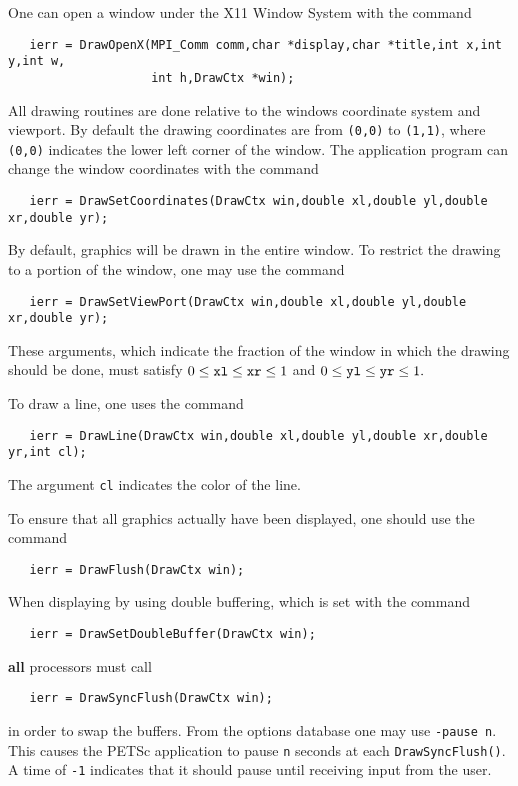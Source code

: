 One can open a window under the X11 Window System with the
command  
\begin{verbatim}
   ierr = DrawOpenX(MPI_Comm comm,char *display,char *title,int x,int y,int w,
                    int h,DrawCtx *win);
\end{verbatim}
All drawing routines are done relative to the windows coordinate system 
and viewport. By default the drawing coordinates are from {\tt (0,0)} to 
{\tt (1,1)}, where {\tt (0,0)} indicates the lower left corner of the 
window. The application program can change the window coordinates with the 
command  
\begin{verbatim}
   ierr = DrawSetCoordinates(DrawCtx win,double xl,double yl,double xr,double yr);
\end{verbatim}
By default, graphics will be drawn in the entire window. To restrict the 
drawing to a portion of the window, one may 
use the command 
\begin{verbatim}
   ierr = DrawSetViewPort(DrawCtx win,double xl,double yl,double xr,double yr);
\end{verbatim}
These arguments, which indicate the fraction of the window in which the 
drawing should be done, must satisfy 
$0 \le {\tt xl} \le {\tt xr} \le 1 $ and $ 0 \le {\tt yl} \le {\tt yr} \le 1.$ 

To draw a line, one uses
 the command  
\begin{verbatim}
   ierr = DrawLine(DrawCtx win,double xl,double yl,double xr,double yr,int cl);
\end{verbatim}
The argument {\tt cl} indicates the color of the line.

To ensure that all graphics actually have been displayed, one should use 
 the
command 
\begin{verbatim}
   ierr = DrawFlush(DrawCtx win);
\end{verbatim}
When displaying by using double buffering, which is set with the
command  
\begin{verbatim}
   ierr = DrawSetDoubleBuffer(DrawCtx win);
\end{verbatim}
{\bf all} processors must call 
\begin{verbatim}
   ierr = DrawSyncFlush(DrawCtx win);
\end{verbatim}
in order to swap the buffers. From the options database one may 
use {\tt -pause n}.  This causes the PETSc application to pause 
{\tt n} seconds at each {\tt DrawSyncFlush()}. A time of {\tt -1}
indicates that it should pause until receiving input from the user.

